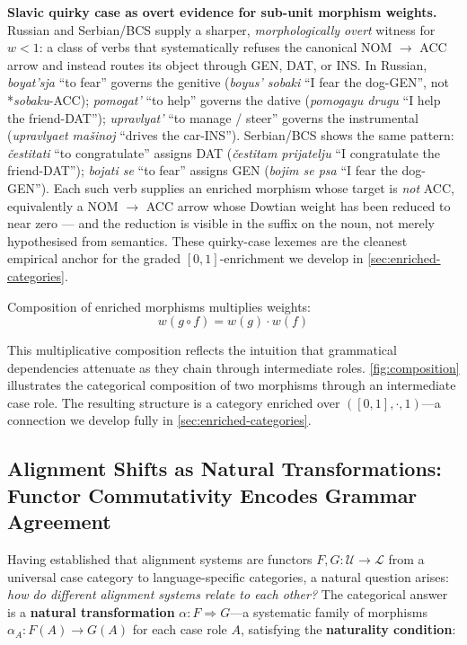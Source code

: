 \documentclass[
]{article}
\begin{document}
\textbf{Slavic quirky case as overt evidence for sub-unit morphism
weights.} Russian and Serbian/BCS supply a sharper,
\emph{morphologically overt} witness for \(w < 1\): a class of verbs
that systematically refuses the canonical NOM \(\to\) ACC arrow and
instead routes its object through GEN, DAT, or INS. In Russian,
\emph{boyat'sja} ``to fear'' governs the genitive (\emph{boyus' sobaki}
``I fear the dog-GEN'', not *\emph{sobaku}-ACC); \emph{pomogat'} ``to
help'' governs the dative (\emph{pomogayu drugu} ``I help the
friend-DAT''); \emph{upravlyat'} ``to manage / steer'' governs the
instrumental (\emph{upravlyaet mašinoj} ``drives the car-INS'').
Serbian/BCS shows the same pattern: \emph{čestitati} ``to congratulate''
assigns DAT (\emph{čestitam prijatelju} ``I congratulate the
friend-DAT''); \emph{bojati se} ``to fear'' assigns GEN (\emph{bojim se
psa} ``I fear the dog-GEN''). Each such verb supplies an enriched
morphism whose target is \emph{not} ACC, equivalently a NOM \(\to\) ACC
arrow whose Dowtian weight has been reduced to near zero --- and the
reduction is visible in the suffix on the noun, not merely hypothesised
from semantics. These quirky-case lexemes are the cleanest empirical
anchor for the graded \([0,1]\)-enrichment we develop in
\autoref{sec:enriched-categories}.

Composition of enriched morphisms multiplies weights: \begin{equation}
w(g \circ f) = w(g) \cdot w(f)
\label{eq:eq-2-1}
\end{equation}

This multiplicative composition reflects the intuition that grammatical
dependencies attenuate as they chain through intermediate roles.
\autoref{fig:composition} illustrates the categorical composition of two
morphisms through an intermediate case role. The resulting structure is
a category enriched over \(([0,1], \cdot, 1)\)---a connection we develop
fully in \autoref{sec:enriched-categories}.

\subsection{Alignment Shifts as Natural Transformations: Functor
Commutativity Encodes Grammar
Agreement}\label{alignment-shifts-as-natural-transformations-functor-commutativity-encodes-grammar-agreement}

Having established that alignment systems are functors
\(F, G: \mathcal{U} \to \mathcal{L}\) from a universal case category to
language-specific categories, a natural question arises: \emph{how do
different alignment systems relate to each other?} The categorical
answer is a \textbf{natural transformation}
\(\alpha: F \Rightarrow G\)---a systematic family of morphisms
\(\alpha_A: F(A) \to G(A)\) for each case role \(A\), satisfying the
\textbf{naturality condition}:
\end{document}
